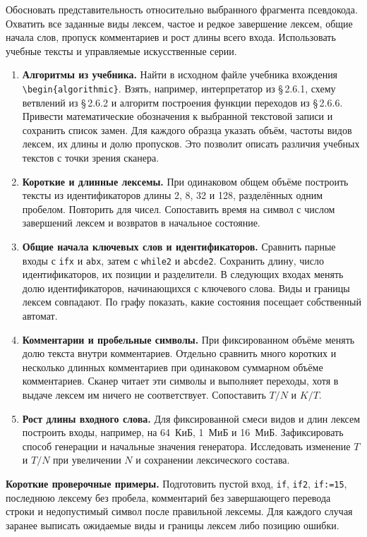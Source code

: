 \documentclass[12pt,a4paper]{article}
\newcommand{\parag}[1]{\S\,#1}
\newcommand{\code}[1]{\texttt{#1}}
\newcommand{\task}[1]{\par\medskip\noindent\textbf{#1}\quad}
\begin{document}
Обосновать представительность относительно выбранного фрагмента псевдокода. Охватить все заданные виды лексем, частое и редкое завершение лексем, общие начала слов, пропуск комментариев и рост длины всего входа. Использовать учебные тексты и управляемые искусственные серии.

\begin{enumerate}
\item \textbf{Алгоритмы из учебника.} Найти в исходном файле учебника вхождения \verb|\begin{algorithmic}|. Взять, например, интерпретатор из \parag{2.6.1}, схему ветвлений из \parag{2.6.2} и алгоритм построения функции переходов из \parag{2.6.6}. Привести математические обозначения к выбранной текстовой записи и сохранить список замен. Для каждого образца указать объём, частоты видов лексем, их длины и долю пропусков. Это позволит описать различия учебных текстов с точки зрения сканера.
\item \textbf{Короткие и длинные лексемы.} При одинаковом общем объёме построить тексты из идентификаторов длины 2, 8, 32 и 128, разделённых одним пробелом. Повторить для чисел. Сопоставить время на символ с числом завершений лексем и возвратов в начальное состояние.
\item \textbf{Общие начала ключевых слов и идентификаторов.} Сравнить парные входы с \code{ifx} и \code{abx}, затем с \code{while2} и \code{abcde2}. Сохранить длину, число идентификаторов, их позиции и разделители. В следующих входах менять долю идентификаторов, начинающихся с ключевого слова. Виды и границы лексем совпадают. По графу показать, какие состояния посещает собственный автомат.
\item \textbf{Комментарии и пробельные символы.} При фиксированном объёме менять долю текста внутри комментариев. Отдельно сравнить много коротких и несколько длинных комментариев при одинаковом суммарном объёме комментариев. Сканер читает эти символы и выполняет переходы, хотя в выдаче лексем им ничего не соответствует. Сопоставить $T/N$ и $K/T$.
\item \textbf{Рост длины входного слова.} Для фиксированной смеси видов и длин лексем построить входы, например, на 64~КиБ, 1~МиБ и 16~МиБ. Зафиксировать способ генерации и начальные значения генератора. Исследовать изменение $T$ и $T/N$ при увеличении $N$ и сохранении лексического состава.
\end{enumerate}

\task{Короткие проверочные примеры.} Подготовить пустой вход, \code{if}, \code{if2}, \code{if:=15}, последнюю лексему без пробела, комментарий без завершающего перевода строки и недопустимый символ после правильной лексемы. Для каждого случая заранее выписать ожидаемые виды и границы лексем либо позицию ошибки.
\end{document}
